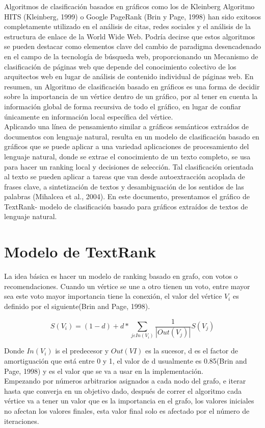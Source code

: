 \documentclass[conference]{IEEEtran}
\begin{document}
Algoritmos de clasificación basados en gráficos como los de Kleinberg Algoritmo HITS (Kleinberg, 1999) o Google PageRank (Brin y Page, 1998) han sido exitosos completamente utilizado en el análisis de citas, redes sociales y el análisis de la estructura de enlace de la World Wide Web. Podría decirse que estos algoritmos se pueden destacar como elementos clave del cambio de paradigma desencadenado en el campo de la tecnología de búsqueda web, proporcionando un Mecanismo de clasificación de páginas web que depende del conocimiento colectivo de los arquitectos web en lugar de análisis de contenido individual de páginas web. En resumen, un Algoritmo de clasificación basado en gráficos es una forma de decidir sobre la importancia de un vértice dentro de un gráfico, por al tener en cuenta la información global de forma recursiva de todo el gráfico, en lugar de confiar únicamente en información local específica del vértice. \\
Aplicando una línea de pensamiento similar a gráficos semánticos extraídos de documentos con  lenguaje natural, resulta en un modelo de clasificación basado en gráficos que se puede aplicar a una variedad aplicaciones de procesamiento del lenguaje natural, donde se extrae el conocimiento de un texto completo, se usa para hacer un ranking local y decisiones de selección. Tal clasificación orientada al texto se pueden aplicar a tareas que van desde autoextracción acoplada de frases clave, a sintetización de textos y desambiguación de los sentidos de las palabras (Mihalcea et al., 2004). En este documento, presentamos el gráfico de TextRank- modelo de clasificación basado para gráficos extraídos de textos de lenguaje natural.

\section{Modelo de TextRank}
La idea básica es hacer un modelo de ranking basado en grafo, con votos o recomendaciones.
Cuando un vértice se une a otro tienen un voto, entre mayor sea este voto mayor importancia tiene la conexión, el valor del vértice $V_i$ es definido por el siguiente(Brin and Page, 1998).

$$S(V_i) = (1-d)+d* \sum_{j\varepsilon In(V_i) }\frac{1}{|Out(V_j)|}S(V_j)$$

Donde $In(V_i)$ is el predecesor y $Out(VI)$ es la sucesor, d es el factor de amortiguación que está entre 0 y 1, el valor de d usualmente es 0.85(Brin and Page, 1998) y es el valor que se va a usar en la implementación. \\
Empezando por números arbitrarios asignados a cada nodo del grafo, e iterar hasta que converja en un objetivo dado, después de correr el algoritmo cada vértice va a tener un valor que es la importancia en el grafo, los valores iniciales no afectan los valores finales, esta valor final solo es afectado por el número de iteraciones.
\end{document}
